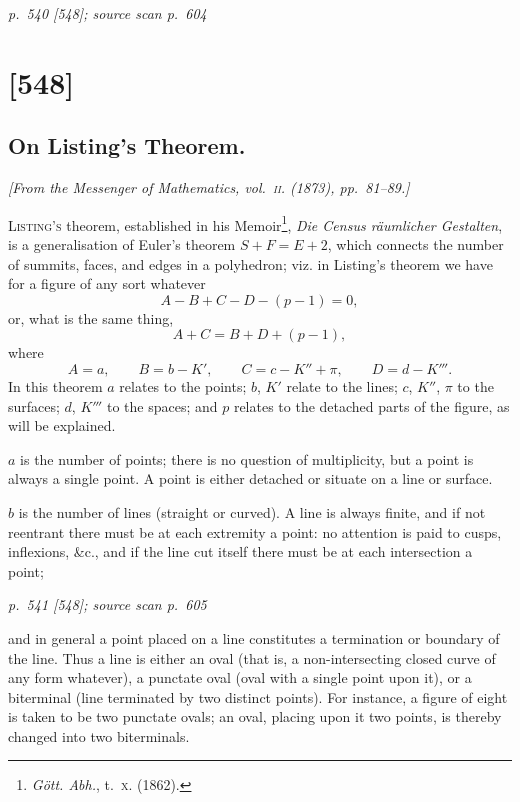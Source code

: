 \documentclass[11pt,a4paper]{article}
\newcommand{\sourcepage}[3]{%
  \bigskip
  \noindent\textit{p.~#1 [#2]; source scan p.~#3}%
  \par\smallskip
}
\begin{document}
\clearpage

\sourcepage{540}{548}{604}
\section{[548]}
\subsection{On Listing's Theorem.}

\begin{center}
\textit{[From the Messenger of Mathematics, vol.~\textsc{ii}. (1873), pp.~81--89.]}
\end{center}

\textsc{Listing's} theorem, established in his Memoir\footnote{\textit{G\"ott. Abh.}, t.~\textsc{x}. (1862).}, \textit{Die Census r\"aumlicher Gestalten}, is a generalisation of Euler's theorem $S+F=E+2$, which connects the number of summits, faces, and edges in a polyhedron; viz. in Listing's theorem we have for a figure of any sort whatever
\[
  A-B+C-D-(p-1)=0,
\]
or, what is the same thing,
\[
  A+C=B+D+(p-1),
\]
where
\[
  A=a,\qquad B=b-K',\qquad C=c-K''+\pi,\qquad D=d-K'''.
\]
In this theorem $a$ relates to the points; $b$, $K'$ relate to the lines; $c$, $K''$, $\pi$ to the surfaces; $d$, $K'''$ to the spaces; and $p$ relates to the detached parts of the figure, as will be explained.

$a$ is the number of points; there is no question of multiplicity, but a point is always a single point.
A point is either detached or situate on a line or surface.

$b$ is the number of lines (straight or curved).
A line is always finite, and if not reentrant there must be at each extremity a point: no attention is paid to cusps, inflexions, \&c., and if the line cut itself there must be at each intersection a point;

\clearpage

\sourcepage{541}{548}{605}
and in general a point placed on a line constitutes a termination or boundary of the line.
Thus a line is either an oval (that is, a non-intersecting closed curve of any form whatever), a punctate oval (oval with a single point upon it), or a biterminal (line terminated by two distinct points).
For instance, a figure of eight is taken to be two punctate ovals; an oval, placing upon it two points, is thereby changed into two biterminals.
\end{document}
